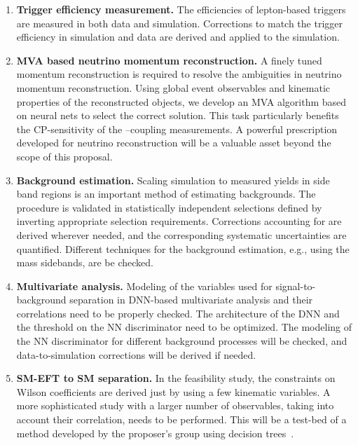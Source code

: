 \documentclass[a4paper,11pt]{article}
\begin{document}
\begin{enumerate}[noitemsep,topsep=0pt]
\item {\bf Trigger efficiency measurement.} The efficiencies of lepton-based triggers are measured in both data and simulation. 
Corrections to match the trigger efficiency in simulation and data are derived and applied to the simulation. 

\item {\bf MVA based neutrino momentum reconstruction.}
A finely tuned momentum reconstruction is required to resolve the ambiguities in neutrino momentum reconstruction. Using global event observables and kinematic properties of the reconstructed objects, we develop an MVA algorithm based on neural nets to select the correct solution. This task particularly benefits the CP-sensitivity of the \PH--\PW coupling measurements. 
A powerful prescription developed for neutrino reconstruction 
will be a valuable asset beyond the scope of this proposal.

\item {\bf Background estimation.} Scaling simulation to measured yields in side band regions is an important method of estimating backgrounds. The procedure is validated in statistically independent selections defined by inverting appropriate selection requirements. %
Corrections accounting for  are derived wherever needed, and the corresponding systematic uncertainties are quantified.   
Different techniques for the background estimation, e.g., using the mass sidebands, are be checked. 

\item {\bf Multivariate analysis.} Modeling of the variables used for signal-to-background separation in DNN-based multivariate analysis and their correlations need to be properly checked. 
The architecture of the DNN and the threshold on the NN discriminator need to be optimized. 
The modeling of the NN discriminator for different background processes will be checked, 
and data-to-simulation corrections will be derived if needed. 

\item {\bf SM-EFT to SM separation.} In the feasibility study, the constraints on Wilson coefficients are derived just by using a few kinematic variables.
A more sophisticated study with a larger number of observables, taking into account their correlation, needs to be performed. 
This will be a test-bed of a method developed by the proposer's group using decision trees~\cite{Chatterjee:2021nms}. 


\end{enumerate}
\end{document}
